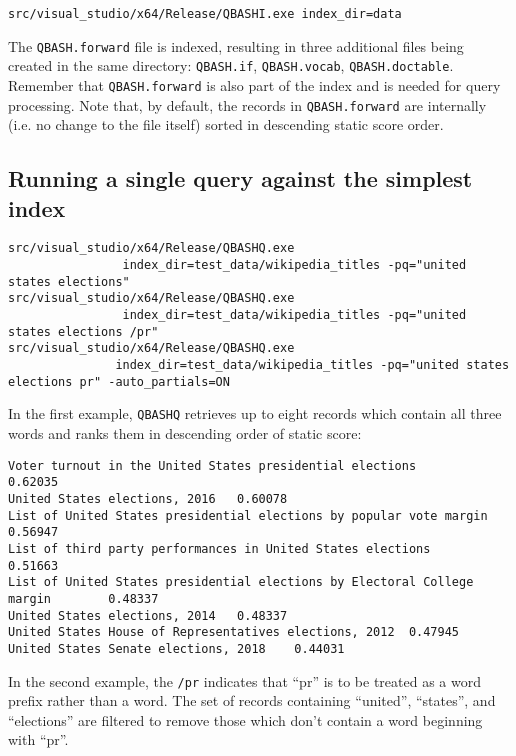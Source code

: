 \documentclass{article}
\begin{document}
{\footnotesize
\begin{verbatim}
src/visual_studio/x64/Release/QBASHI.exe index_dir=data
\end{verbatim}
}

\noindent The \texttt{QBASH.forward} file is indexed, resulting in three
additional files being created in the same directory:
\texttt{QBASH.if}, \texttt{QBASH.vocab}, \texttt{QBASH.doctable}.
Remember that \texttt{QBASH.forward} is also part of the index and is
needed for query processing.  Note that, by default, the records in
\texttt{QBASH.forward} are internally (i.e. no change to the file
itself) sorted in descending static score order.

\subsection{Running a single query against the simplest index}
{\footnotesize
\begin{verbatim}
src/visual_studio/x64/Release/QBASHQ.exe
                index_dir=test_data/wikipedia_titles -pq="united states elections"
src/visual_studio/x64/Release/QBASHQ.exe
                index_dir=test_data/wikipedia_titles -pq="united states elections /pr"
src/visual_studio/x64/Release/QBASHQ.exe
               index_dir=test_data/wikipedia_titles -pq="united states elections pr" -auto_partials=ON
\end{verbatim}
}

\noindent In the first example, \texttt{QBASHQ} retrieves up to eight records which
contain all three words and ranks them in descending order of static
score:
{\footnotesize
\begin{verbatim}
Voter turnout in the United States presidential elections       0.62035
United States elections, 2016   0.60078
List of United States presidential elections by popular vote margin     0.56947
List of third party performances in United States elections     0.51663
List of United States presidential elections by Electoral College margin        0.48337
United States elections, 2014   0.48337
United States House of Representatives elections, 2012  0.47945
United States Senate elections, 2018    0.44031

\end{verbatim}
}

\noindent In the second example, the \texttt{/pr} indicates that ``pr'' is to be
treated as a word prefix rather than a word.   The set of records
containing ``united'', ``states'', and  ``elections'' are filtered to remove those which
don't contain a word beginning with ``pr''.  
\end{document}
